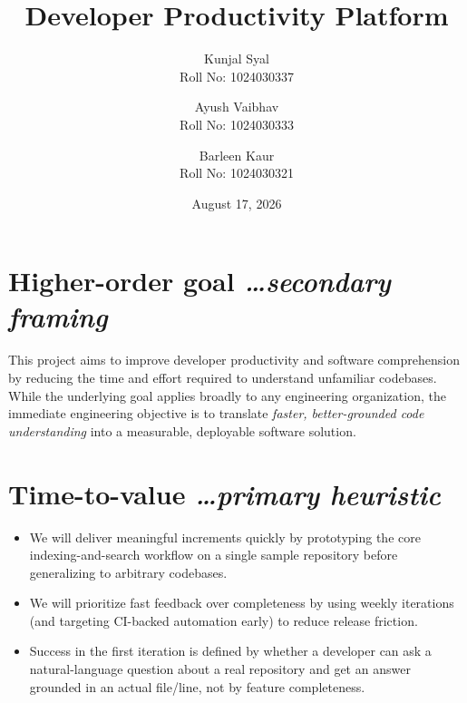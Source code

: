 \documentclass[11pt,a4paper]{article}
\title{Developer Productivity Platform}
\author{
  \begin{tabular}[t]{c}
    Kunjal Syal \\ \small Roll No: 1024030337
  \end{tabular}
  \and
  \begin{tabular}[t]{c}
    Ayush Vaibhav \\ \small Roll No: 1024030333
  \end{tabular}
  \and
  \begin{tabular}[t]{c}
    Barleen Kaur \\ \small Roll No: 1024030321
  \end{tabular}
}
\date{August 17, 2026}
\newcommand{\BvrHint}[1]{%
  {\normalfont\normalsize\itshape\hfill #1}}
\begin{document}
\maketitle

\section{Higher-order goal%
  \BvrHint{\ldots secondary framing}}
This project aims to improve developer productivity and
software comprehension by reducing the time and effort
required to understand unfamiliar codebases. While the
underlying goal applies broadly to any engineering
organization, the immediate engineering objective is to
translate \emph{faster, better-grounded code
  understanding} into a measurable, deployable software
solution.

\section{Time-to-value %
\BvrHint{\ldots primary heuristic}}
\begin{itemize}[leftmargin=0.7cm]
    \item We will deliver meaningful increments quickly by prototyping the core indexing-and-search workflow on a single sample repository before generalizing to arbitrary codebases.
    \item We will prioritize fast feedback over completeness by using weekly iterations (and targeting CI-backed automation early) to reduce release friction.
    \item Success in the first iteration is defined by whether a developer can ask a natural-language question about a real repository and get an answer grounded in an actual file/line, not by feature completeness.
\end{itemize}
\end{document}
